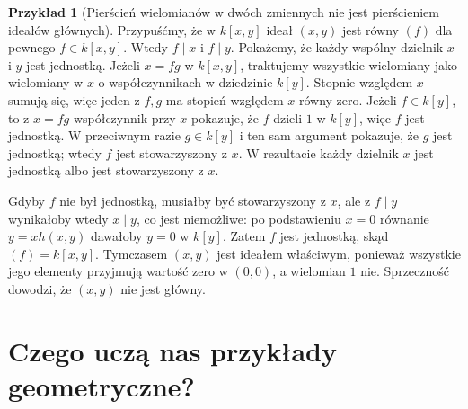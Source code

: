 \documentclass[11pt,a4paper,openany]{report}
\numberwithin{equation}{section}
\theoremstyle{plain}
\theoremstyle{definition}
\newtheorem{przyklad}[twierdzenie]{Przykład}
\theoremstyle{remark}
\begin{document}
\begin{center}
\end{center}

\begin{przyklad}[Pierścień wielomianów w dwóch zmiennych nie jest pierścieniem ideałów głównych]
Przypuśćmy, że w $k[x,y]$ ideał $(x,y)$ jest równy $(f)$
dla pewnego $f\in k[x,y]$. Wtedy $f\mid x$ i $f\mid y$.
Pokażemy, że każdy wspólny dzielnik $x$ i $y$ jest jednostką.
Jeżeli $x=fg$ w $k[x,y]$, traktujemy wszystkie wielomiany
jako wielomiany w $x$ o współczynnikach w dziedzinie $k[y]$.
Stopnie względem $x$ sumują się, więc jeden z $f,g$ ma stopień
względem $x$ równy zero. Jeżeli $f\in k[y]$, to z $x=fg$
współczynnik przy $x$ pokazuje, że $f$ dzieli $1$ w $k[y]$,
więc $f$ jest jednostką. W przeciwnym razie $g\in k[y]$
i ten sam argument pokazuje, że $g$ jest jednostką;
wtedy $f$ jest stowarzyszony z $x$.
W rezultacie każdy dzielnik $x$ jest jednostką albo jest
stowarzyszony z $x$.

Gdyby $f$ nie był jednostką, musiałby być stowarzyszony z $x$,
ale z $f\mid y$ wynikałoby wtedy $x\mid y$, co jest niemożliwe:
po podstawieniu $x=0$ równanie $y=xh(x,y)$ dawałoby $y=0$
w $k[y]$. Zatem $f$ jest jednostką, skąd $(f)=k[x,y]$.
Tymczasem $(x,y)$ jest ideałem właściwym, ponieważ
wszystkie jego elementy przyjmują wartość zero w $(0,0)$,
a wielomian $1$ nie. Sprzeczność dowodzi, że $(x,y)$ nie jest główny.
\end{przyklad}

\section{Czego uczą nas przykłady geometryczne?}
\end{document}
